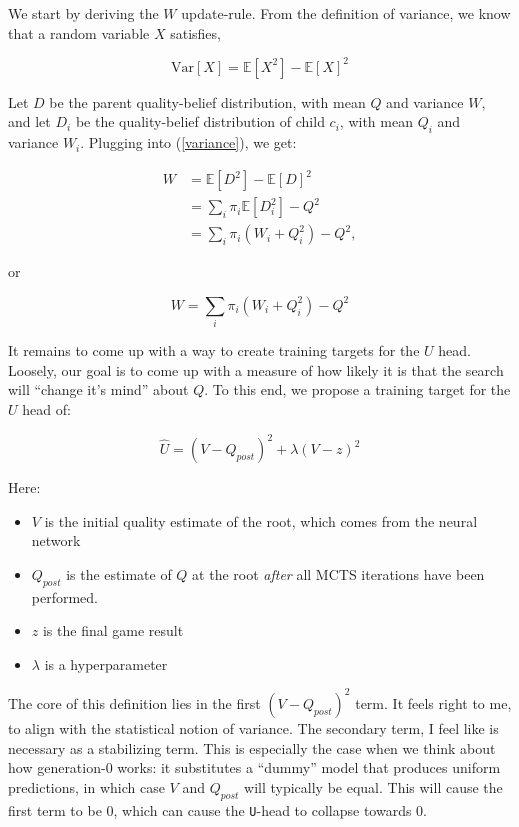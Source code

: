 \documentclass[tikz]{article}
\newcommand{\Var}{\mathrm{Var}}
\begin{document}
We start by deriving the $W$ update-rule. From the definition of variance, we know that a random variable $X$ satisfies,

\begin{equation}
\label{variance}    
\Var[X] = \mathbb{E}[X^2] - \mathbb{E}[X]^2
\end{equation}

Let $D$ be the parent quality-belief distribution, with mean $Q$ and variance $W$, and let $D_i$ be the quality-belief distribution of
child $c_i$, with mean $Q_i$ and variance $W_i$. Plugging into (\ref{variance}), we get:

\begin{align*}
W &= \mathbb{E}[D^2] - \mathbb{E}[D]^2 \\
&= \sum_{i} \pi_i \mathbb{E}[D_i^2] - Q^2 \\
&= \sum_{i} \pi_i (W_i + Q_i^2) - Q^2,
\end{align*}

or

\begin{equation}
\label{W-update}    
W = \sum_{i} \pi_i (W_i + Q_i^2) - Q^2
\end{equation}

It remains to come up with a way to create training targets for the $U$ head. Loosely, our goal is to come up with a measure of how
likely it is that the search will ``change it's mind'' about $Q$. To this end, we propose a training target for the $U$ head of:

$$\hat{U} = (V - Q_{post})^2 + \lambda(V - z)^2$$

Here:

\begin{itemize}
    \item $V$ is the initial quality estimate of the root, which comes from the neural network
    \item $Q_{post}$ is the estimate of $Q$ at the root \emph{after} all MCTS iterations have been performed.
    \item $z$ is the final game result
    \item $\lambda$ is a hyperparameter
\end{itemize}

The core of this definition lies in the first $(V - Q_{post})^2$ term. It feels right to me, to align with the statistical notion of 
variance. The secondary term, I feel like is necessary as a stabilizing term. This is especially the case when we think about how
generation-0 works: it substitutes a ``dummy'' model that produces uniform predictions, in which case $V$ and $Q_{post}$ will
typically be equal. This will cause the first term to be 0, which can cause the \texttt{U}-head to collapse towards 0. \newline
\end{document}
